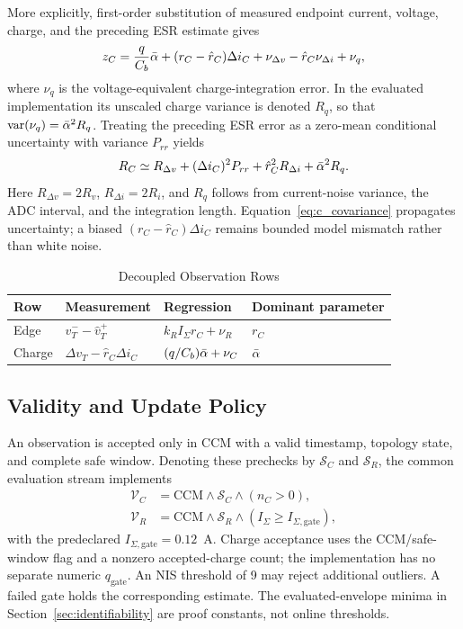 More explicitly, first-order substitution of measured endpoint current, voltage, charge, and the preceding ESR estimate gives
\begin{multline}
z_C=\frac{q}{C_b}\bar{\alpha}+(r_C-\hat r_C)\Delta i_C
+\nu_{\Delta v}-\hat r_C\nu_{\Delta i}+\nu_q,
\label{eq:c_mismatch}
\end{multline}
where $\nu_q$ is the voltage-equivalent charge-integration error. In the evaluated implementation its unscaled charge variance is denoted $R_q$, so that $\operatorname{var}(\nu_q)=\bar{\alpha}^2R_q$. Treating the preceding ESR error as a zero-mean conditional uncertainty with variance $P_{rr}$ yields
\begin{equation}
R_C\simeq R_{\Delta v}+(\Delta i_C)^2P_{rr}
+\hat r_C^2R_{\Delta i}+\bar{\alpha}^2R_q.
\label{eq:c_covariance}
\end{equation}
Here $R_{\Delta v}=2R_v$, $R_{\Delta i}=2R_i$, and $R_q$ follows from current-noise variance, the ADC interval, and the integration length. Equation~\eqref{eq:c_covariance} propagates uncertainty; a biased $(r_C-\hat r_C)\Delta i_C$ remains bounded model mismatch rather than white noise.

\begin{table}[t]
\caption{Decoupled Observation Rows}
\label{tab:observations}
\centering
\footnotesize
\begin{tabular}{p{0.9cm}p{2.35cm}p{2.1cm}p{1.35cm}}
\toprule
Row & Measurement & Regression & Dominant parameter \\
\midrule
Edge & $\hat v_T^- -\hat v_T^+$ & $k_R I_\Sigma r_C+\nu_R$ & $r_C$ \\
Charge & $\Delta v_T-\hat r_C\Delta i_C$ & $(q/C_b)\bar{\alpha}+\nu_C$ & $\bar{\alpha}$ \\
\bottomrule
\end{tabular}
\end{table}

\subsection{Validity and Update Policy}

An observation is accepted only in CCM with a valid timestamp, topology state, and complete safe window. Denoting these prechecks by $\mathcal S_C$ and $\mathcal S_R$, the common evaluation stream implements
\begin{equation}
\begin{aligned}
\mathcal V_C&=\mathrm{CCM}\wedge\mathcal S_C\wedge(n_C>0),\\
\mathcal V_R&=\mathrm{CCM}\wedge\mathcal S_R\wedge
(I_\Sigma\ge I_{\Sigma,\mathrm{gate}}),
\end{aligned}
\label{eq:gates}
\end{equation}
with the predeclared $I_{\Sigma,\mathrm{gate}}=0.12$~A. Charge acceptance uses the CCM/safe-window flag and a nonzero accepted-charge count; the implementation has no separate numeric $q_{\mathrm{gate}}$. An NIS threshold of 9 may reject additional \TSKF{} outliers. A failed gate holds the corresponding estimate. The evaluated-envelope minima in Section~\ref{sec:identifiability} are proof constants, not online thresholds.

